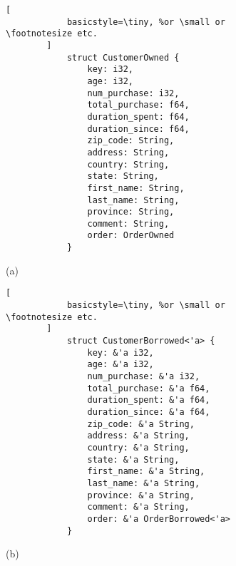 \begin{figure}[htb]
    \begin{subfigure}{.5\textwidth}\centering
        \begin{lstlisting}[
            basicstyle=\tiny, %or \small or \footnotesize etc.
        ]
            struct CustomerOwned {
                key: i32,
                age: i32,
                num_purchase: i32,
                total_purchase: f64,
                duration_spent: f64, 
                duration_since: f64,
                zip_code: String,
                address: String,
                country: String,
                state: String,
                first_name: String,
                last_name: String,
                province: String,
                comment: String, 
                order: OrderOwned
            }
        \end{lstlisting}
      \medskip
      \centerline{(a)}
    \end{subfigure}\hfill
    \begin{subfigure}{.5\textwidth}\centering
        \begin{lstlisting}[
            basicstyle=\tiny, %or \small or \footnotesize etc.
        ]
            struct CustomerBorrowed<'a> {
                key: &'a i32,
                age: &'a i32,
                num_purchase: &'a i32,
                total_purchase: &'a f64,
                duration_spent: &'a f64, 
                duration_since: &'a f64,
                zip_code: &'a String,
                address: &'a String,
                country: &'a String,
                state: &'a String,
                first_name: &'a String,
                last_name: &'a String,
                province: &'a String,
                comment: &'a String, 
                order: &'a OrderBorrowed<'a>
            }
        \end{lstlisting}
      \medskip
      \centerline{(b)}
    \end{subfigure}\hfill

    \medskip


\end{figure}
